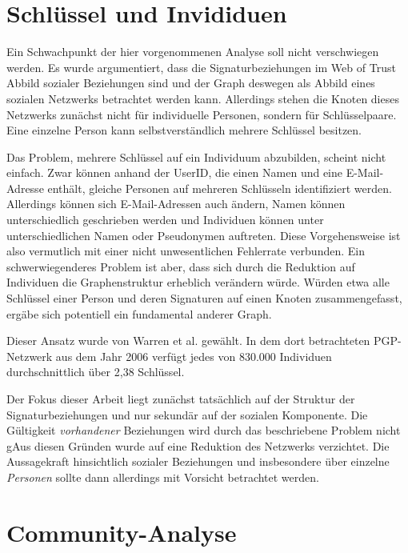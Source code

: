 \section{Schl\"ussel und Invididuen}
\label{sec:schl-und-invid}

Ein Schwachpunkt der hier vorgenommenen Analyse soll nicht
verschwiegen werden. Es wurde argumentiert, dass die
Signaturbeziehungen im Web of Trust Abbild sozialer Beziehungen sind
und der Graph deswegen als Abbild eines sozialen Netzwerks betrachtet
werden kann. Allerdings stehen die Knoten dieses Netzwerks zun\"achst
nicht f\"ur individuelle Personen, sondern f\"ur
Schl\"usselpaare. Eine einzelne Person kann selbstverst\"andlich
mehrere Schl\"ussel besitzen.

Das Problem, mehrere Schl\"ussel auf ein Individuum abzubilden,
scheint nicht einfach. Zwar k\"onnen anhand der UserID, die einen
Namen und eine E-Mail-Adresse enth\"alt, gleiche Personen auf mehreren
Schl\"usseln identifiziert werden. Allerdings k\"onnen sich
E-Mail-Adressen auch \"andern, Namen k\"onnen unterschiedlich
geschrieben werden und Individuen k\"onnen unter unterschiedlichen
Namen oder Pseudonymen auftreten. Diese Vorgehensweise ist also
vermutlich mit einer nicht unwesentlichen Fehlerrate verbunden. Ein
schwerwiegenderes Problem ist aber, dass sich durch die Reduktion auf
Individuen die Graphenstruktur erheblich ver\"andern w\"urde. W\"urden
etwa alle Schl\"ussel einer Person und deren Signaturen auf einen
Knoten zusammengefasst, erg\"abe sich potentiell ein fundamental
anderer Graph.

Dieser Ansatz wurde von Warren et al.\cite{Warren2007} gew\"ahlt. In
dem dort betrachteten PGP-Netzwerk aus dem Jahr 2006 verf\"ugt jedes
von 830.000 Individuen durchschnittlich \"uber 2,38 Schl\"ussel.

Der Fokus dieser Arbeit liegt zun\"achst tats\"achlich auf der
Struktur der Signaturbeziehungen und nur sekund\"ar auf der sozialen
Komponente. Die G\"ultigkeit \emph{vorhandener} Beziehungen wird durch
das beschriebene Problem nicht gAus diesen Gr\"unden wurde auf eine Reduktion des
Netzwerks verzichtet. Die Aussagekraft hinsichtlich sozialer
Beziehungen und insbesondere \"uber einzelne \emph{Personen} sollte
dann allerdings mit Vorsicht betrachtet werden.

\section{Community-Analyse}
\label{sec:community-analyse}

